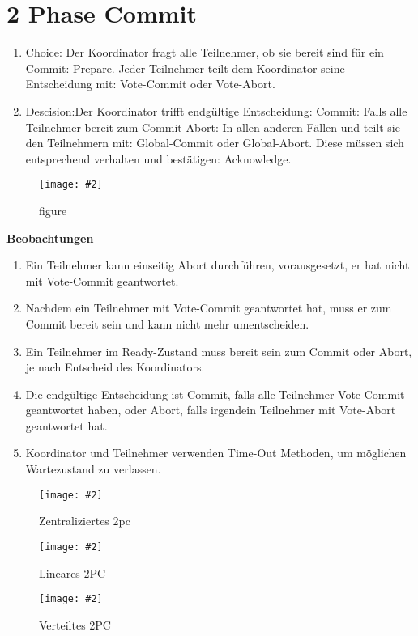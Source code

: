 \documentclass[a4paper,10pt,titlepage=false]{scrreprt}
\newcommand{\pic}[2][figure]{\begin{figure}[h]
 \centering
 \texttt{[image: \#2]}
 \caption{#1}
\end{figure}
}
\begin{document}
\section{2 Phase Commit} %
\label{sec:2_phase_commit}
\begin{enumerate}
  \item Choice: Der Koordinator fragt alle Teilnehmer, ob sie bereit sind für ein
Commit: Prepare.
Jeder Teilnehmer teilt dem Koordinator seine Entscheidung mit:
Vote-Commit oder Vote-Abort.
\item Descision:Der Koordinator trifft endgültige Entscheidung:
Commit: Falls alle Teilnehmer bereit zum Commit
Abort: In allen anderen Fällen
und teilt sie den Teilnehmern mit: Global-Commit oder
Global-Abort.
Diese müssen sich entsprechend verhalten und bestätigen:
Acknowledge.
\end{enumerate}
\pic{2pcabl.png}

\textbf{Beobachtungen}
\begin{enumerate}
\item Ein Teilnehmer kann einseitig Abort durchführen,
vorausgesetzt, er hat nicht mit Vote-Commit geantwortet.
\item Nachdem ein Teilnehmer mit Vote-Commit geantwortet hat,
muss er zum Commit bereit sein und kann nicht mehr
umentscheiden.
\item Ein Teilnehmer im Ready-Zustand muss bereit sein zum
Commit oder Abort, je nach Entscheid des Koordinators.
\item Die endgültige Entscheidung ist Commit, falls alle
Teilnehmer Vote-Commit geantwortet haben, oder Abort,
falls irgendein Teilnehmer mit Vote-Abort geantwortet hat.
\item Koordinator und Teilnehmer verwenden Time-Out
Methoden, um möglichen Wartezustand zu verlassen.

\end{enumerate}
\pic[Zentraliziertes 2pc]{z2pc.png}
\pic[Lineares 2PC]{l2pc.png}
\pic[Verteiltes 2PC]{v2pc.png}
\end{document}
